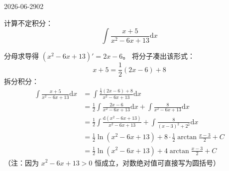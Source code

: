 \begin{mistake}{2026-06-29}{02}

\begin{problemcontent}
计算不定积分：
\[ \int \frac{x+5}{x^2 - 6x + 13} \mathrm{d}x \]
\end{problemcontent}

\begin{solutioncontent}
分母求导得 \( (x^2 - 6x + 13)' = 2x - 6 \)。
将分子凑出该形式：
\[ x+5 = \frac{1}{2}(2x - 6) + 8 \]
拆分积分：
\[
\begin{aligned}
\int \frac{x+5}{x^2 - 6x + 13} \mathrm{d}x &= \int \frac{\frac{1}{2}(2x - 6) + 8}{x^2 - 6x + 13} \mathrm{d}x \\
&= \frac{1}{2} \int \frac{2x - 6}{x^2 - 6x + 13} \mathrm{d}x + \int \frac{8}{x^2 - 6x + 13} \mathrm{d}x \\
&= \frac{1}{2} \int \frac{\mathrm{d}(x^2 - 6x + 13)}{x^2 - 6x + 13} + \int \frac{8}{(x-3)^2 + 2^2} \mathrm{d}x \\
&= \frac{1}{2} \ln(x^2 - 6x + 13) + 8 \cdot \frac{1}{2} \arctan \frac{x-3}{2} + C \\
&= \frac{1}{2} \ln(x^2 - 6x + 13) + 4 \arctan \frac{x-3}{2} + C
\end{aligned}
\]
（注：因为 \(x^2 - 6x + 13 > 0\) 恒成立，对数绝对值可直接写为圆括号）
\end{solutioncontent}


\end{mistake}

